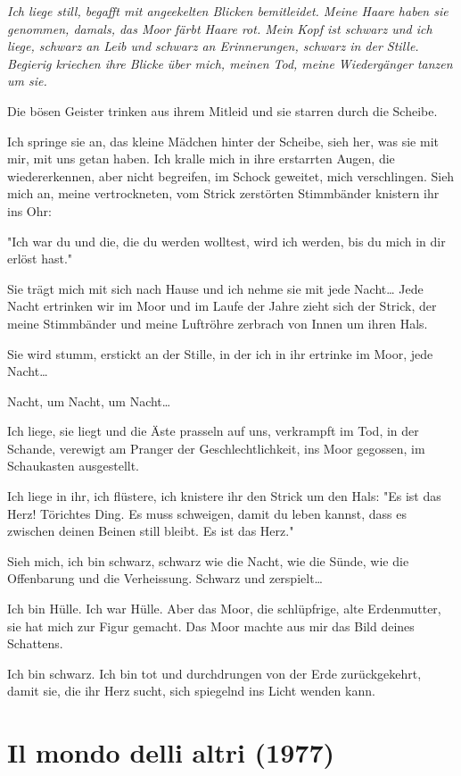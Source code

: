 \documentclass[10pt,titlepage,a5paper]{book}
\begin{document}
{\em Ich liege still, begafft  mit angeekelten Blicken bemitleidet. Meine Haare haben sie genommen, damals, das Moor färbt Haare rot.
Mein Kopf ist schwarz und ich liege, schwarz an Leib und schwarz an Erinnerungen, schwarz in der Stille. Begierig kriechen ihre Blicke über mich, meinen Tod, meine Wiedergänger tanzen um sie.

Die bösen Geister trinken aus ihrem Mitleid und sie starren durch die Scheibe.

Ich springe sie an, das kleine Mädchen hinter der Scheibe, sieh her, was sie mit mir, mit uns getan haben. Ich kralle mich in ihre erstarrten Augen, die wiedererkennen, aber nicht begreifen, im Schock geweitet, mich verschlingen. Sieh mich an, meine vertrockneten, vom Strick zerstörten Stimmbänder knistern ihr ins Ohr:

"Ich war du und die, die du werden wolltest, wird ich werden, bis du mich in dir erlöst hast."

Sie trägt mich mit sich nach Hause und ich nehme sie mit jede Nacht\dots
Jede Nacht ertrinken wir im Moor und im Laufe der Jahre zieht sich der Strick, der meine Stimmbänder und meine Luftröhre zerbrach von Innen um ihren Hals.

Sie wird stumm, erstickt an der Stille, in der ich in ihr ertrinke im Moor, jede Nacht\dots

Nacht, um Nacht, um Nacht\dots

Ich liege, sie liegt und die Äste prasseln auf uns, verkrampft im Tod, in der Schande, verewigt am Pranger der Geschlechtlichkeit, ins Moor gegossen, im Schaukasten ausgestellt.

Ich liege in ihr, ich flüstere, ich knistere ihr den Strick um den Hals:
"Es ist das Herz! Törichtes Ding. Es muss schweigen, damit du leben kannst, dass es zwischen deinen Beinen still bleibt. Es ist das Herz."

Sieh mich, ich bin schwarz, schwarz wie die Nacht, wie die Sünde, wie die Offenbarung und die Verheissung. Schwarz und zerspielt\dots

Ich bin Hülle. Ich war Hülle. Aber das Moor, die schlüpfrige, alte Erdenmutter, sie hat mich zur Figur gemacht. Das Moor machte aus mir das Bild deines Schattens.

Ich bin schwarz. Ich bin tot und durchdrungen von der Erde zurückgekehrt, damit sie, die ihr Herz sucht, sich spiegelnd ins Licht wenden kann.}


\section*{Il mondo delli altri (1977)}
\end{document}
